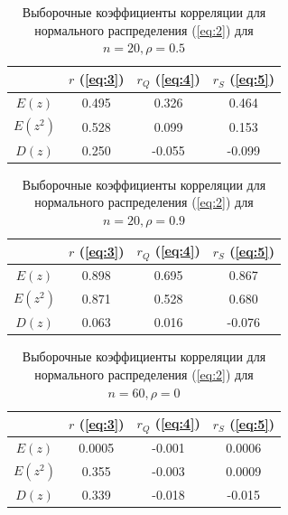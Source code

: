 \documentclass{article}
\begin{document}
\begin{table} [hb]
\begin{center}
\begin{tabular}{|c|c|c|c|}
\hline 
 & $r$ (\ref{eq:3}) & $r_Q$ (\ref{eq:4}) & $r_S$ (\ref{eq:5}) \\ 
\hline 
$E(z)$ & 0.495 & 0.326 & 0.464 \\
\hline 
$E(z^2)$ & 0.528 & 0.099 & 0.153 \\
\hline 
$D(z)$ & 0.250 & -0.055 & -0.099 \\
\hline 
\end{tabular} 
\caption{Выборочные коэффициенты корреляции для нормального распределения (\ref{eq:2}) для $n = 20, \rho = 0.5$}
\end{center}
\end{table}

\begin{table} [hb]
\begin{center}
\begin{tabular}{|c|c|c|c|}
\hline 
 & $r$ (\ref{eq:3}) & $r_Q$ (\ref{eq:4}) & $r_S$ (\ref{eq:5}) \\ 
\hline 
$E(z)$ & 0.898 & 0.695 & 0.867 \\
\hline 
$E(z^2)$ & 0.871 & 0.528 & 0.680 \\
\hline 
$D(z)$ & 0.063 & 0.016 & -0.076 \\
\hline 
\end{tabular} 
\caption{Выборочные коэффициенты корреляции для нормального распределения (\ref{eq:2}) для $n = 20, \rho = 0.9$}
\end{center}
\end{table}

\newpage
\begin{table} [hb]
\begin{center}
\begin{tabular}{|c|c|c|c|}
\hline 
 & $r$ (\ref{eq:3}) & $r_Q$ (\ref{eq:4}) & $r_S$ (\ref{eq:5}) \\ 
\hline 
$E(z)$ & 0.0005 & -0.001 & 0.0006 \\
\hline 
$E(z^2)$ & 0.355 & -0.003 & 0.0009 \\
\hline 
$D(z)$ & 0.339 & -0.018 & -0.015 \\
\hline 
\end{tabular} 
\caption{Выборочные коэффициенты корреляции для нормального распределения (\ref{eq:2}) для $n = 60, \rho = 0$}
\end{center}
\end{table}
\end{document}
